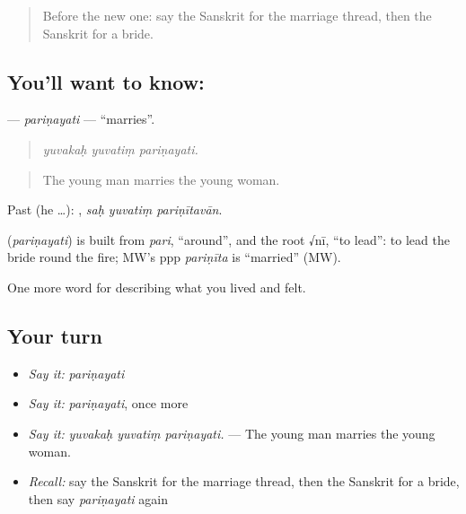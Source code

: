 \label{lesson:SA-C496-parinayati}



\begin{quote}
Before the new one: say the Sanskrit for the marriage thread, then the Sanskrit for a bride.
\end{quote}

\subsection*{You'll want to know: }
\textbf{} — \emph{pariṇayati} — \textquotedblleft{}marries\textquotedblright{}.

\begin{quote}
  
\end{quote}

\begin{quote}
\emph{yuvakaḥ yuvatiṃ pariṇayati.}
\end{quote}

\begin{quote}
The young man marries the young woman.
\end{quote}

Past (he …):   , \emph{saḥ yuvatiṃ pariṇītavān}.

\begin{cousinweb}
\textbf{} (\emph{pariṇayati}) is built from \emph{pari}, \textquotedblleft{}around\textquotedblright{}, and the root √nī, \textquotedblleft{}to lead\textquotedblright{}: to lead the bride round the fire; MW's ppp \emph{pariṇīta} is \textquotedblleft{}married\textquotedblright{} (MW).
\end{cousinweb}

\begin{grammarlens}[title={What you've built}]
One more word for describing what you lived and felt.
\end{grammarlens}

\subsection*{Your turn}
\begin{itemize}
\raggedright
  \item \emph{Say it:} \emph{pariṇayati}
  \item \emph{Say it:} \emph{pariṇayati}, once more
  \item \emph{Say it:} \emph{yuvakaḥ yuvatiṃ pariṇayati.} — The young man marries the young woman.
  \item \emph{Recall:} say the Sanskrit for the marriage thread, then the Sanskrit for a bride, then say \emph{pariṇayati} again
\end{itemize}

